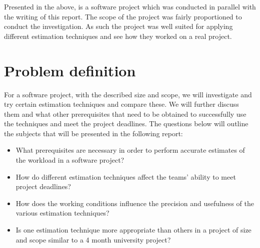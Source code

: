 Presented in the above, is a software project which was conducted in parallel with the writing of this report. The scope of the project was fairly proportioned to conduct the investigation. As such the project was well suited for applying different estimation techniques and see how they worked on a real project.


\section{Problem definition}
For a software project, with the described size and scope, we will investigate and try certain estimation techniques and compare these. We will further discuss them and what other prerequisites that need to be obtained to successfully use the techniques and meet the project deadlines. The questions below will outline the subjects that will be presented in the following report:  
\begin{itemize}
\item What prerequisites are necessary in order to perform accurate estimates of the workload in a software project?
\item How do different estimation techniques affect the teams' ability to meet project deadlines?
\item How does the working conditions influence the precision and usefulness of the various estimation techniques?	
\item Is one estimation technique more appropriate than others in a project of size and scope similar to a 4 month university project?
\end{itemize}
\newpage
